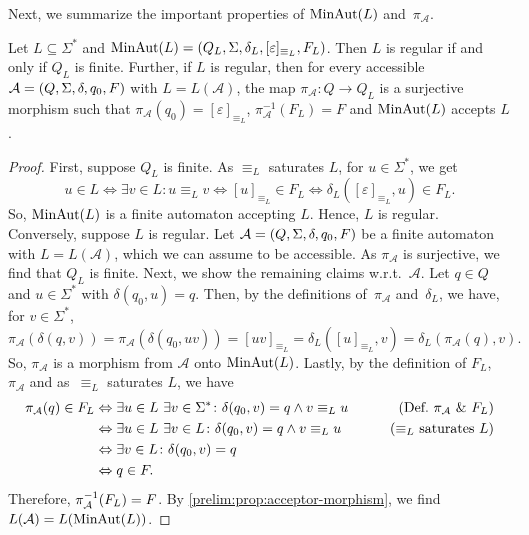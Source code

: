 Next, we summarize the important properties of $\minaut{L}$ and~$\pi_{\mathcal A}$.

\begin{theorem}
	\label{prelim:min_aut:terminal_object}
	Let $L \subseteq \Sigma^*$ and $\minaut{L} = (Q_L, \Sigma, \delta_L, [\varepsilon]_{\equiv_L}, F_L)$.
	Then $L$ is regular if and only 
	if $Q_L$ is finite. Further,
	if $L$ is regular, then for every accessible $\automat{A}{Q}{\Sigma}{\delta}{q_0}{F}$
	with $L = L(\mathcal A)$,
	the map $\pi_{\mathcal A} \colon Q \to Q_L$
	is a surjective morphism 
    such that $\pi_{\mathcal A}(q_0) = [\varepsilon]_{\equiv_L}$, 
    $\pi_{\mathcal A}^{-1}(F_L) = F$ and
    $\minaut{L}$ accepts $L$.
\end{theorem}
\begin{proof}
	First, suppose $Q_L$ is finite.
	As $\equiv_L$ saturates $L$, for $u \in \Sigma^*$, we 
	get
	\[
	u \in L \Leftrightarrow \exists v \in L \colon u \equiv_L v 
	        \Leftrightarrow [u]_{\equiv_L} \in F_L
	        \Leftrightarrow \delta_L([\varepsilon]_{\equiv_L}, u) \in F_L.
	\]
	So, $\minaut{L}$
	is a finite automaton accepting $L$.
	Hence, $L$ is regular.	
	Conversely, suppose $L$ is regular.
	Let $\automat{A}{Q}{\Sigma}{\delta}{q_0}{F}$ be
	a finite automaton with $L = L(\mathcal A)$, which we can assume to be accessible.
	As $\pi_{\mathcal A}$ is surjective, we find
	that $Q_L$ is finite.	
	Next, we show the remaining claims w.r.t.~$\mathcal A$.
	Let $q \in Q$ and $u \in \Sigma^*$ with $\delta(q_0, u) = q$.
	Then, by the definitions of~$\pi_{\mathcal A}$ and~$\delta_L$, 
	we have, for $v \in \Sigma^*$,
	\[
	\pi_{\mathcal A}(\delta(q, v)) = \pi_{\mathcal A}(\delta(q_0, uv)) = [uv]_{\equiv_L} = \delta_L([u]_{\equiv_L}, v) 
	= \delta_L(\pi_{\mathcal A}(q), v).
	\]
    So, $\pi_{\mathcal A}$ is a morphism from $\mathcal A$ onto $\minaut{L}$.
	Lastly, by the definition of $F_L$, $\pi_{\mathcal A}$ and as~$\equiv_L$ saturates $L$, we have
	\begin{align*}
		\pi_{\mathcal A}(q) \in F_L 
		& \Leftrightarrow \exists u \in L \ \exists v \in \Sigma^* \colon \delta(q_0, v) = q \land v \equiv_L u & \tag{Def.~$\pi_{\mathcal A}$ \& $F_L$} \\
		& \Leftrightarrow \exists u \in L \ \exists v \in L \colon \delta(q_0, v) = q \land v \equiv_L u & \tag{$\equiv_L$ saturates $L$} \\
		& \Leftrightarrow \exists v \in L \colon \delta(q_0, v) = q  \\
		& \Leftrightarrow q \in F.
	\end{align*}
	Therefore, $\applyfunc{F_L}{\pi_{\mathcal A}^{-1}} = F$.
	By \cref{prelim:prop:acceptor-morphism}, we find $L(\mathcal A) = L(\minaut{L})$.
\end{proof}

